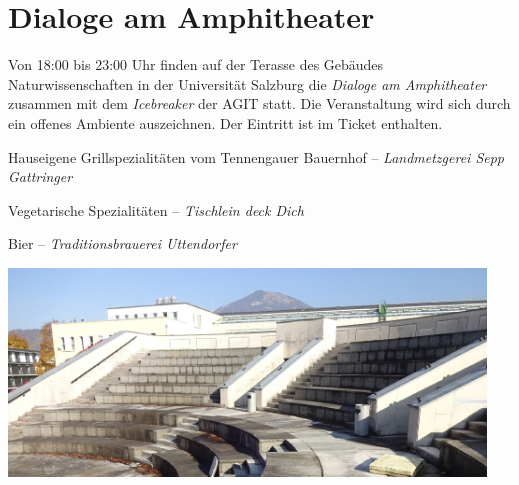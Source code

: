 \newpage
\thispagestyle{empty}
\section*{Dialoge am Amphitheater}
\label{social-event}
Von 18:00 bis 23:00 Uhr finden auf der Terasse des Gebäudes Naturwissenschaften in der Universität Salzburg
die \emph{Dialoge am Amphitheater} zusammen mit dem \emph{Icebreaker} der AGIT statt.
Die Veranstaltung wird sich durch ein offenes Ambiente auszeichnen. Der Eintritt ist im Ticket enthalten.

\begin{center}
\noindent Hauseigene Grillspezialitäten vom Tennengauer Bauernhof -- \emph{Landmetzgerei Sepp Gattringer}

\vspace{0.5\baselineskip}
\noindent Vegetarische Spezialitäten -- \emph{Tischlein deck Dich}

\vspace{0.5\baselineskip}
\noindent Bier -- \emph{Traditionsbrauerei Uttendorfer}

\vspace{0.5\baselineskip}
\noindent\includegraphics[width=0.95\textwidth]{images-print/amphitheater-rechts-crop.jpg}
\end{center}

\justifying
